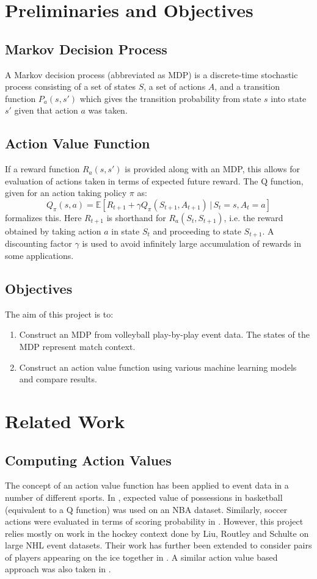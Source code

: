 \documentclass{sfuthesis}
\begin{document}
	\section{Preliminaries and Objectives}
	\subsection{Markov Decision Process}
	A Markov decision process (abbreviated as MDP) is a discrete-time stochastic process consisting of a set of states $S$, a set of actions $A$, and a transition function $P_a(s,s')$ which gives the transition probability from state $s$ into state $s'$ given that action $a$ was taken. 
	\subsection{Action Value Function}
	If a reward function $R_a(s,s')$ is provided along with an MDP, this allows for evaluation of actions taken in terms of expected future reward. The Q function, given for an action taking policy $\pi$ as:
	\begin{equation}
		Q_\pi(s,a) = \mathbb{E} \left[  R_{t+1} + \gamma Q_{\pi}(S_{t+1}, A_{t+1}) \, | \, S_t = s, A_t = a \right]
	\end{equation}
	formalizes this. Here $R_{t+1}$ is shorthand for $R_a(S_t,S_{t+1})$, i.e. the reward obtained by taking action $a$ in state $S_t$ and proceeding to state $S_{t+1}$. A discounting factor $\gamma$ is used to avoid infinitely large accumulation of rewards in some applications.
	\subsection{Objectives}
	The aim of this project is to:
	\begin{enumerate}
		\item Construct an MDP from volleyball play-by-play event data. The states of the MDP represent match context.
		\item Construct an action value function using various machine learning models and compare results.
	\end{enumerate}  
	
	\section{Related Work}
	\subsection{Computing Action Values}
	The concept of an action value function has been applied to event data in a number of different sports. In \cite{cervone2014pointwise}, expected value of possessions in basketball (equivalent to a Q function) was used on an NBA dataset. Similarly, soccer actions were evaluated in terms of scoring probability in \cite{decroos2019actions}. However, this project relies mostly on work in the hockey context done by Liu, Routley and Schulte \cite{liu2018deep, routley2015markov, schulte2017markov, schulte2017apples} on large NHL event datasets. Their work has further been extended to consider pairs of players appearing on the ice together in \cite{Ljung2019}. A similar action value based approach was also taken in \cite{kaplan2014markov}.
\end{document}
